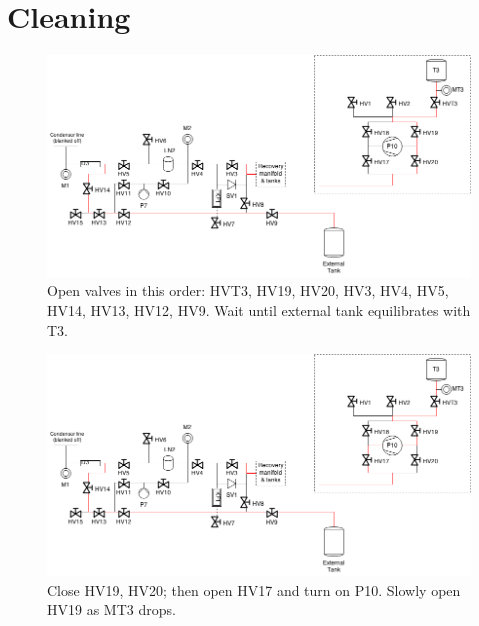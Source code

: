 \documentclass[a4paper,10pt]{article}
\begin{document}
\section{Cleaning}

\begin{figure}[htbp!]
 \centering
 \includegraphics[width=\textwidth]{./mash-cleaning-schematic-2-gas-to-ext-tank.png}
 \caption{Open valves in this order: HVT3, HV19, HV20, HV3, HV4, HV5, HV14, HV13, HV12, HV9.  Wait until external tank equilibrates with T3.}
 \label{b}
\end{figure}

\begin{figure}[htbp!]
 \centering
 \includegraphics[width=\textwidth]{./mash-cleaning-schematic-3-pump-gas-to-ext-tank.png}
 \caption{Close HV19, HV20; then open HV17 and turn on P10.  Slowly open HV19 as MT3 drops.}
 \label{c}
\end{figure}
\end{document}
